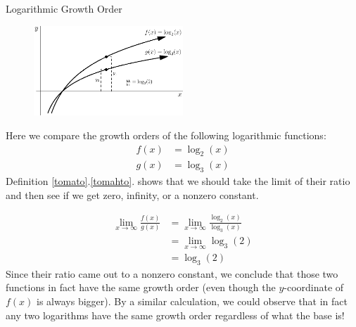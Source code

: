 \begin{example}{Logarithmic Growth Order}
\begin{figure}
 \begin{center}
 	\includegraphics[width=0.5\textwidth]{ChapterGeom/Figures/LogGrowthOrder}
 \end{center}
\end{figure}
Here we compare the growth orders of the following logarithmic functions:
\begin{align*}
f(x)&=\log_2(x) \\
g(x)&=\log_3(x)
\end{align*}
Definition \ref{tomato}.\ref{tomahto}. shows that we should take the limit of their ratio and then see if we get zero, infinity, or a nonzero constant.

\begin{align*}
\lim_{x\to \infty}\frac{f(x)}{g(x)}&=\lim_{x\to \infty}\frac{\log_2(x)}{\log_3(x)}\\
&=\lim_{x\to \infty}\log_3(2) \\
&=\log_3(2)
\end{align*}
Since their ratio came out to a nonzero constant, we conclude that those two functions in fact have the same growth order (even though  the $y$-coordinate of $f(x)$ is always bigger).  By a similar calculation, we could observe that in fact any two logarithms have the same growth order regardless of what the base is!
\end{example}

